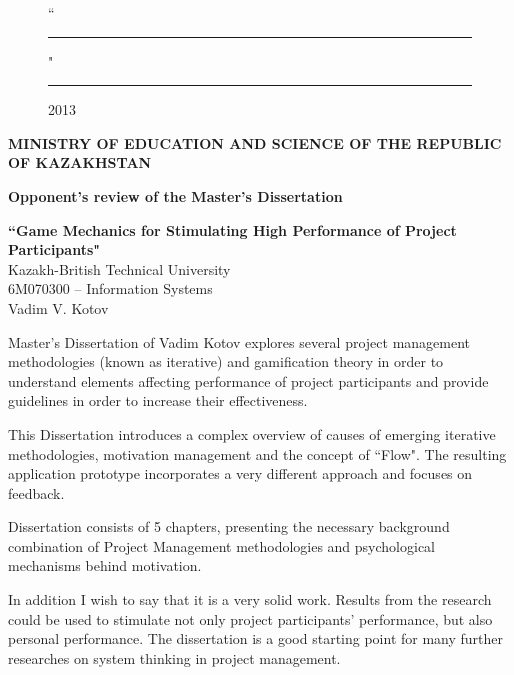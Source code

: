 \begin{titlepage}
\begin{figure}[ht]
\begin{minipage}[t]{0.6\linewidth}
                ``\rule{2em}{0.4pt}" \rule{8em}{0.4pt} 2013\\
         \end{minipage}
    \end{figure}
        
        \pagebreak

    \begin{centering}
        {\bf{\MakeUppercase{Ministry of education and science of the republic of Kazakhstan}}}

       \vspace{14pt}

        {\bf
        Opponent's review of the Master's Dissertation\\
        }

        \vspace{14pt}
        
        {\bf``Game Mechanics for Stimulating High Performance of Project Participants"}\\
        {\small Kazakh-British Technical University\\
        6M070300 -- Information Systems\\
        Vadim V. Kotov\\}
        
        \vspace{14pt}
        
    \end{centering}
    
    Master's Dissertation of Vadim Kotov explores several project management methodologies (known as iterative) and gamification theory in order to understand elements affecting performance of project participants and provide guidelines in order to increase their effectiveness.
    
    This Dissertation introduces a complex overview of causes of emerging iterative methodologies, motivation management and the concept of ``Flow". The resulting application prototype incorporates a very different approach and focuses on feedback.
    
    Dissertation consists of 5 chapters, presenting the necessary background combination of Project Management methodologies and psychological mechanisms behind motivation.
    
    In addition I wish to say that it is a very solid work. Results from the research could be used to stimulate not only project participants' performance, but also personal performance. The dissertation is a good starting point for many further researches on system thinking in project management.
    

\end{titlepage}
